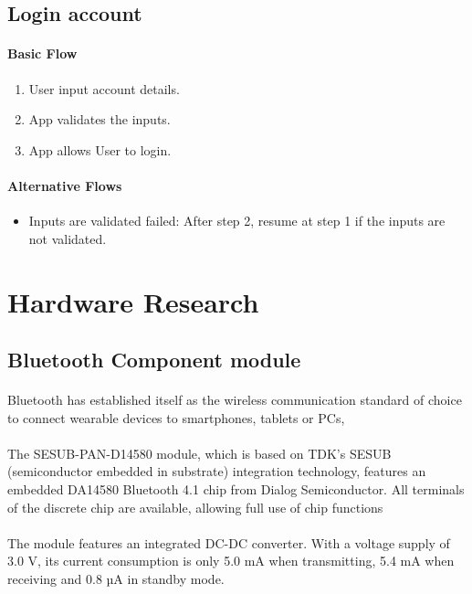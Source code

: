 \documentclass[12pt,a4paper]{article}
\begin{document}
\begin{appendices}
      \subsection{Login account}
      \paragraph{Basic Flow}
        \begin{enumerate}
          \item User input account details.
          \item App validates the inputs.
          \item App allows User to login.
        \end{enumerate}
      \paragraph{Alternative Flows}
        \begin{itemize}
          \item Inputs are validated failed: After step 2, resume at step 1 if the inputs are not validated.
        \end{itemize}
    
    \section{Hardware Research}
     \label{appendix:hardware-research}
    \subsection{Bluetooth Component module}
      \paragraph{}
      Bluetooth has established itself as the wireless communication standard of choice to connect wearable devices to smartphones, tablets or PCs,
      \paragraph{}
      The SESUB-PAN-D14580 module, which is based on TDK's SESUB (semiconductor embedded in substrate) integration technology, features an embedded DA14580 Bluetooth 4.1 chip from Dialog Semiconductor. All terminals of the discrete chip are available, allowing full use of chip functions
      \paragraph{}
      The module features an integrated DC-DC converter. With a voltage supply of 3.0 V, its current consumption is only 5.0 mA when transmitting, 5.4 mA when receiving and 0.8 µA in standby mode.

\end{appendices}
\end{document}
